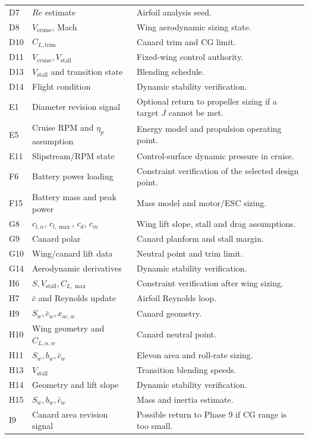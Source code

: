 \begin{longtable}{@{}p{}p{}p{}@{}}
D7 & \(Re\) estimate & Airfoil analysis seed. \\
D8 & \(V_{\mathrm{cruise}}\), Mach & Wing aerodynamic sizing state. \\
D10 & \(C_{L,\mathrm{trim}}\) & Canard trim and CG limit. \\
D11 & \(V_{\mathrm{cruise}},V_{\mathrm{stall}}\) & Fixed-wing control authority. \\
D13 & \(V_{\mathrm{stall}}\) and transition state & Blending schedule. \\
D14 & Flight condition & Dynamic stability verification. \\
E1 & Diameter revision signal & Optional return to propeller sizing if a target \(J\) cannot be met. \\
E5 & Cruise RPM and \(\eta_p\) assumption & Energy model and propulsion operating point. \\
E11 & Slipstream/RPM state & Control-surface dynamic pressure in cruise. \\
F6 & Battery power loading & Constraint verification of the selected design point. \\
F15 & Battery mass and peak power & Mass model and motor/ESC sizing. \\
G8 & \(c_{l,\alpha}\), \(c_{l,\max}\), \(c_d\), \(c_m\) & Wing lift slope, stall and drag assumptions. \\
G9 & Canard polar & Canard planform and stall margin. \\
G10 & Wing/canard lift data & Neutral point and trim limit. \\
G14 & Aerodynamic derivatives & Dynamic stability verification. \\
H6 & \(S,V_{\mathrm{stall}},C_{L,\max}\) & Constraint verification after wing sizing. \\
H7 & \(\bar{c}\) and Reynolds update & Airfoil Reynolds loop. \\
H9 & \(S_w,\bar{c}_w,x_{ac,w}\) & Canard geometry. \\
H10 & Wing geometry and \(C_{L,\alpha,w}\) & Canard neutral point. \\
H11 & \(S_w,b_w,\bar{c}_w\) & Elevon area and roll-rate sizing. \\
H13 & \(V_{\mathrm{stall}}\) & Transition blending speeds. \\
H14 & Geometry and lift slope & Dynamic stability verification. \\
H15 & \(S_w,b_w,\bar{c}_w\) & Mass and inertia estimate. \\
I9 & Canard area revision signal & Possible return to Phase 9 if CG range is too small. \\

\end{longtable}
